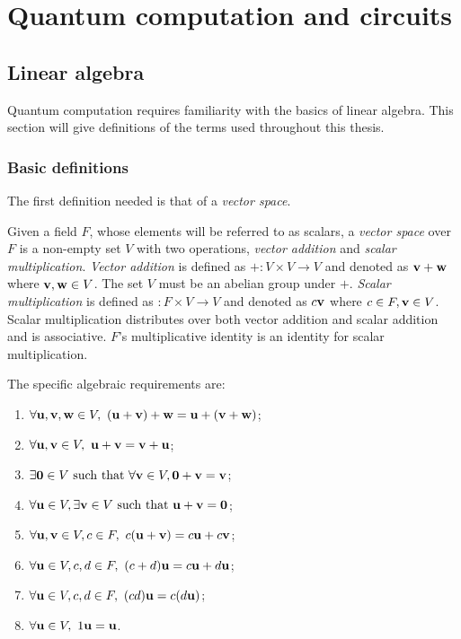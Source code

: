 
\chapter{Quantum computation and circuits}\label{chap:quantumcompandcircuits}

\section{Linear algebra} %
\label{sec:linear_algebra}

Quantum computation requires  familiarity with
the basics of linear algebra. This section will give definitions of the
terms used throughout this thesis.
\subsection{Basic definitions} %
\label{sub:basic_definitions}


The first definition needed is that of a \emph{vector space}.

\begin{definition}
  Given a field $F$, whose elements will be referred to as scalars, a \emph{vector space} over $F$
  is a non-empty set $V$ with two operations, \emph{vector addition} and \emph{scalar
  multiplication}. \emph{Vector addition} is defined as ${+}:V\times V \to V$ and denoted as
  $\mathbf{v}+\mathbf{w}$ where $\mathbf{v},\mathbf{w}\in V$. The set $V$ must be an abelian group under $+$.
  \emph{Scalar multiplication} is defined as ${}:F\times V \to V$ and denoted as $c\mathbf{v}$ where
  $c\in F, \mathbf{v} \in V$. Scalar multiplication distributes over both vector addition and scalar
  addition and is associative. $F$'s multiplicative identity is an identity for scalar
  multiplication.

\end{definition}
The specific algebraic requirements are:
\begin{enumerate}
  \item{}$\forall \vc{u},\vc{v},\vc{w} \in V,\ (\vc{u} +\vc{v}) +\vc{w} =
    \vc{u}+ (\vc{v}+\vc{w})$;
  \item{}$\forall \mathbf{u},\mathbf{v} \in V,\ \mathbf{u} +\mathbf{v} =
    \mathbf{v}+ \mathbf{u}$;
  \item{}$\exists  \vc{0} \in V \mathrm{\ such\ that\ } \forall \vc{v} \in V,
    \vc{0} +\vc{v} =  \vc{v}$;
  \item{}$\forall \mathbf{u} \in V, \exists \mathbf{v} \in V \mathrm{\ such\ that\ }
    \mathbf{u}+ \mathbf{v} = \mathbf{0}$;
  \item{}$\forall \mathbf{u},\mathbf{v} \in V, c\in F,\
    c(\mathbf{u}+ \mathbf{v}) = c\mathbf{u} + c\mathbf{v}$;
  \item{}$\forall \mathbf{u} \in V, c,d\in F,\
    (c+d)\mathbf{u} = c\mathbf{u} + d\mathbf{u}$;
  \item{}$\forall \mathbf{u} \in V, c,d\in F,\
    (c d)\mathbf{u} = c(d\mathbf{u})$;
  \item{}$\forall \mathbf{u} \in V,\
    1\mathbf{u} = \mathbf{u}$.
\end{enumerate}

